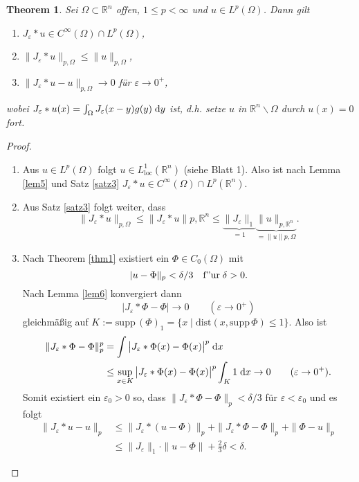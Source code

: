 \documentclass[
paper=a4,
bibtotocnumbered,
liststotocnumbered,
tablecaptionabove,
pointlessnumbers,
twoside,
openright,
10pt
]
{report}
\newcommand{\supp}{\mathrm{supp}\,}
\newcommand{\dist}{\mathrm{dist}}
\let\epsilon\varepsilon
\newtheorem{thm}{Theorem}[chapter]
\theoremstyle{definition}
\numberwithin{equation}{chapter}
\begin{document}
\begin{thm}\label{thm7}
Sei $\Omega\subset\mathbb{R}^n$ offen,  $1\leq p <\infty$ und $u\in L^p(\Omega)$. Dann gilt
\begin{enumerate}[\bf (a)]
\item $J_\epsilon \ast u \in C^\infty(\Omega)\cap L^p(\Omega)$,
\item $\|J_\epsilon\ast u\|_{p,\Omega}\leq \|u\|_{p,\Omega}$,
\item $\|J_\epsilon\ast u -u\|_{p,\Omega}\rightarrow 0$ für $\epsilon\rightarrow 0^+$,
\end{enumerate}
wobei $J_\epsilon\ast u(x)=\int_\Omega J_\epsilon(x-y)g(y)\d y$ ist, d.h. setze $u$ in $\mathbb{R}^n\backslash\Omega$ durch $u(x)=0$ fort.
\end{thm}

\begin{proof}
\begin{enumerate}[\bf (a)]
\item Aus $u\in L^p(\Omega)$ folgt $u\in L_{\mathrm{loc}}^1(\mathbb{R}^n)$ (siehe Blatt 1). Also ist nach Lemma \ref{lem5} und Satz \ref{satz3} $J_\epsilon\ast u\in C^\infty(\Omega)\cap L^p(\mathbb{R}^n)$. 
\item Aus Satz \ref{satz3} folgt weiter, dass
\begin{equation}
\|J_\epsilon\ast u\|_{p,\Omega} 
\leq \|J_\epsilon\ast u\|{p,\mathbb{R}^n}
\leq \underbrace{\|J_\epsilon\|_1}_{=1}\underbrace{\|u\|_{p,\mathbb{R}^n}}_{=\|u\|{p,\Omega}}.
\end{equation}
\item Nach Theorem \ref{thm1} existiert ein $\Phi\in C_0(\Omega)$ mit 
\begin{equation}
|u-\Phi\|_p <\delta/3 \quad\mathrm{f"ur}\;\delta >0.
\end{equation}
 Nach Lemma \ref{lem6} konvergiert dann
\begin{equation}
|J_\epsilon\ast \Phi -\Phi|\rightarrow 0\qquad (\epsilon\rightarrow 0^+)
\end{equation}
gleichmäßig auf $K:=\supp (\Phi)_1=\{x\mid \dist(x,\supp\Phi)\leq 1\}$. Also ist
\begin{align}
\|J_\epsilon\ast \Phi-\Phi\|_p^p 
&= \int \big| J_\epsilon\ast\Phi(x)-\Phi(x) \big|^p\d x \\
&\leq \sup\limits_{x\in K} \big| J_\epsilon\ast\Phi(x)-\Phi(x) \big|^p \int_K 1\d x\rightarrow 0 \qquad (\epsilon\rightarrow 0^+).
\end{align}
Somit existiert ein $\epsilon_0 >0$ so, dass $\|J_\epsilon\ast \Phi-\Phi\|_p <\delta/3$ für $\epsilon<\epsilon_0$ und es folgt
\begin{align}
\|J_\epsilon\ast u-u\|_p 
&\leq \|J_\epsilon\ast (u-\Phi)\|_p +\|J_\epsilon\ast \Phi-\Phi\|_p +\|\Phi-u\|_p \\
&\leq \|J_\epsilon\|_1\cdot \|u-\Phi\| +\frac{2}{3}\delta <\delta.
\end{align}
\end{enumerate}
\end{proof}
\end{document}
